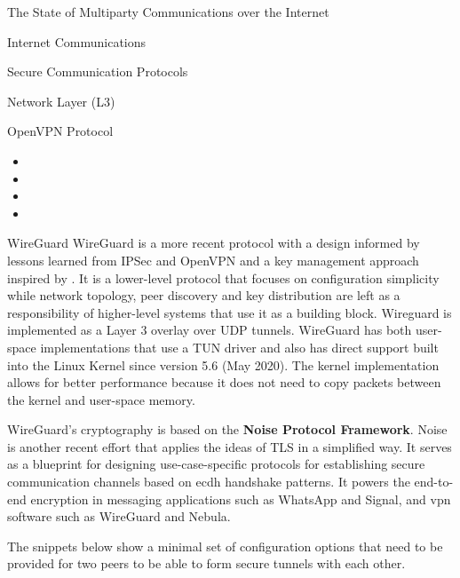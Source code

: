 \begin{frame}[fragile]{The State of Multiparty Communications over the
Internet}
\begin{block}{Internet Communications}
\begin{block}{Secure Communication Protocols}
\begin{block}{Network Layer (L3)}
\begin{block}{OpenVPN Protocol}
\protect\hypertarget{openvpn-protocol}{}
\begin{itemize}
\tightlist
\item
\item
\item
\item
\end{itemize}
\end{block}

\begin{block}{WireGuard}
\protect\hypertarget{wireguard}{}
WireGuard \autocite{donenfeldWireGuardNextGeneration2017} is a more
recent protocol with a design informed by lessons learned from IPSec and
OpenVPN and a key management approach inspired by . It is a
lower-level protocol that focuses on configuration simplicity while
network topology, peer discovery and key distribution are left as a
responsibility of higher-level systems that use it as a building block.
Wireguard is implemented as a Layer 3 overlay over UDP tunnels.
WireGuard has both user-space implementations that use a TUN driver and
also has direct support built into the Linux Kernel since version 5.6
(May 2020). The kernel implementation allows for better performance
because it does not need to copy packets between the kernel and
user-space memory.

WireGuard's cryptography is based on the \textbf{Noise Protocol
Framework}\autocite{noiseDocs}. Noise is another recent effort that
applies the ideas of TLS in a simplified way. It serves as a blueprint
for designing use-case-specific protocols for establishing secure
communication channels based on \gls{ecdh} handshake patterns. It powers
the end-to-end encryption in messaging applications such as WhatsApp and
Signal, and \gls{vpn} software such as WireGuard and Nebula.
 

The snippets below show a minimal set of configuration options that need
to be provided for two peers to be able to form secure tunnels with each
other.

\begin{Shaded}
\begin{Highlighting}[]
\KeywordTok{[Interface]}
\OtherTok{=}
\OtherTok{=}\StringTok{ }
\OtherTok{=}


\end{Highlighting}
\end{Shaded}
\end{block}
\end{block}
\end{block}
\end{block}
\end{frame}
